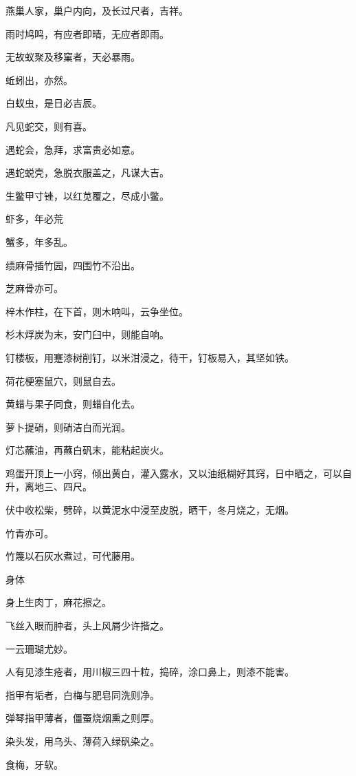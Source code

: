 \documentclass[a4paper,12pt,UTF8,twoside]{ctexbook}
\begin{document}
    燕巢人家，巢户内向，及长过尺者，吉祥。
    
    雨时鸠鸣，有应者即晴，无应者即雨。
    
    无故蚁聚及移窠者，天必暴雨。
    
    蚯蚓出，亦然。
    
    白蚁虫，是日必吉辰。
    
    凡见蛇交，则有喜。
    
    遇蛇会，急拜，求富贵必如意。
    
    遇蛇蜕壳，急脱衣服盖之，凡谋大吉。
    
    生鳖甲寸锉，以红苋覆之，尽成小鳖。
    
    虾多，年必荒
    
    蟹多，年多乱。
    
    绩麻骨插竹园，四围竹不沿出。
    
    芝麻骨亦可。
    
    梓木作柱，在下首，则木响叫，云争坐位。
    
    杉木烰炭为末，安门臼中，则能自响。
    
    钉楼板，用蹇漆树削钉，以米泔浸之，待干，钉板易入，其坚如铁。
    
    荷花梗塞鼠穴，则鼠自去。
    
    黄蜡与果子同食，则蜡自化去。
    
    萝卜提硝，则硝洁白而光润。
    
    灯芯蘸油，再蘸白矾末，能粘起炭火。
    
    鸡蛋开顶上一小窍，倾出黄白，灌入露水，又以油纸糊好其窍，日中晒之，可以自升，离地三、四尺。
    
    伏中收松柴，劈碎，以黄泥水中浸至皮脱，晒干，冬月烧之，无烟。
    
    竹青亦可。
    
    竹篾以石灰水煮过，可代藤用。
    
    身体
    
    身上生肉丁，麻花擦之。
    
    飞丝入眼而肿者，头上风屑少许揩之。
    
    一云珊瑚尤妙。
    
    人有见漆生疮者，用川椒三四十粒，捣碎，涂口鼻上，则漆不能害。
    
    指甲有垢者，白梅与肥皂同洗则净。
    
    弹琴指甲薄者，僵蚕烧烟熏之则厚。
    
    染头发，用乌头、薄荷入绿矾染之。
    
    食梅，牙软。
    
\end{document}
